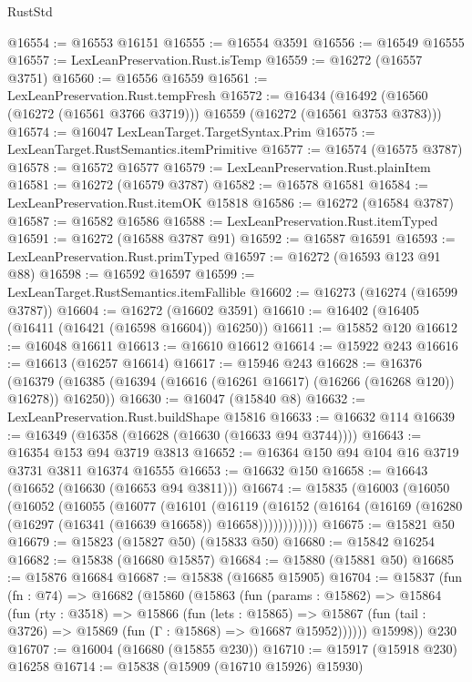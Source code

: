 \begin{lexlean}{RustStd}
\begin{coremodule}
@16554 := @16553 @16151
@16555 := @16554 @3591
@16556 := @16549 @16555
@16557 := LexLeanPreservation.Rust.isTemp
@16559 := @16272 (@16557 @3751)
@16560 := @16556 @16559
@16561 := LexLeanPreservation.Rust.tempFresh
@16572 := @16434
    (@16492 (@16560 (@16272 (@16561 @3766 @3719))) @16559 (@16272 (@16561 @3753 @3783)))
@16574 := @16047 LexLeanTarget.TargetSyntax.Prim
@16575 := LexLeanTarget.RustSemantics.itemPrimitive
@16577 := @16574 (@16575 @3787)
@16578 := @16572 @16577
@16579 := LexLeanPreservation.Rust.plainItem
@16581 := @16272 (@16579 @3787)
@16582 := @16578 @16581
@16584 := LexLeanPreservation.Rust.itemOK @15818
@16586 := @16272 (@16584 @3787)
@16587 := @16582 @16586
@16588 := LexLeanPreservation.Rust.itemTyped
@16591 := @16272 (@16588 @3787 @91)
@16592 := @16587 @16591
@16593 := LexLeanPreservation.Rust.primTyped
@16597 := @16272 (@16593 @123 @91 @88)
@16598 := @16592 @16597
@16599 := LexLeanTarget.RustSemantics.itemFallible
@16602 := @16273 (@16274 (@16599 @3787))
@16604 := @16272 (@16602 @3591)
@16610 := @16402 (@16405 (@16411 (@16421 (@16598 @16604)) @16250))
@16611 := @15852 @120
@16612 := @16048 @16611
@16613 := @16610 @16612
@16614 := @15922 @243
@16616 := @16613 (@16257 @16614)
@16617 := @15946 @243
@16628 := @16376
    (@16379 (@16385 (@16394 (@16616 (@16261 @16617) (@16266 (@16268 @120)) @16278)) @16250))
@16630 := @16047 (@15840 @8)
@16632 := LexLeanPreservation.Rust.buildShape @15816
@16633 := @16632 @114
@16639 := @16349 (@16358 (@16628 (@16630 (@16633 @94 @3744))))
@16643 := @16354 @153 @94 @3719 @3813
@16652 := @16364 @150 @94 @104 @16 @3719 @3731 @3811 @16374 @16555
@16653 := @16632 @150
@16658 := @16643 (@16652 (@16630 (@16653 @94 @3811)))
@16674 := @15835
    (@16003
      (@16050
        (@16052
          (@16055
            (@16077
              (@16101
                (@16119
                  (@16152
                    (@16164 (@16169 (@16280 (@16297 (@16341 (@16639 @16658)) @16658))))))))))))
@16675 := @15821 @50
@16679 := @15823 (@15827 @50) (@15833 @50)
@16680 := @15842 @16254
@16682 := @15838 (@16680 @15857)
@16684 := @15880 (@15881 @50)
@16685 := @15876 @16684
@16687 := @15838 (@16685 @15905)
@16704 := @15837
    (fun (fn : @74) =>
    @16682
      (@15860
        (@15863
          (fun (params : @15862) =>
          @15864
            (fun (rty : @3518) =>
            @15866
              (fun (lets : @15865) =>
              @15867 (fun (tail : @3726) => @15869 (fun (Γ : @15868) => @16687 @15952))))))
        @15998))
    @230
@16707 := @16004 (@16680 (@15855 @230))
@16710 := @15917 (@15918 @230) @16258
@16714 := @15838 (@15909 (@16710 @15926) @15930)

\end{coremodule}
\end{lexlean}
